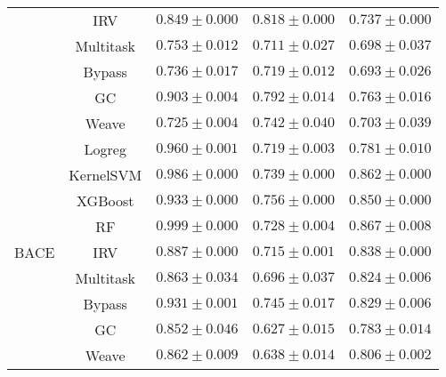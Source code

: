 \begin{table}[H]
\begin{tabular}{ |c|c|c|c|c| }
    & IRV & $0.849\pm0.000$ & $0.818\pm0.000$ & $0.737\pm0.000$ \\\cline{2-5}
    & Multitask & $0.753\pm0.012$ & $0.711\pm0.027$ & $0.698\pm0.037$ \\\cline{2-5}
    & Bypass & $0.736\pm0.017$ & $0.719\pm0.012$ & $0.693\pm0.026$ \\\cline{2-5}
    & GC & $0.903\pm0.004$ & $0.792\pm0.014$ & $0.763\pm0.016$ \\\cline{2-5}
    & Weave & $0.725\pm0.004$ & $0.742\pm0.040$ & $0.703\pm0.039$ \\\cline{2-5}
    \hline
    \hline    
    \multirow{9}{*}{BACE}
    & Logreg & $0.960\pm0.001$ & $0.719\pm0.003$ & $0.781\pm0.010$ \\\cline{2-5}
    & KernelSVM & $0.986\pm0.000$ & $0.739\pm0.000$ & $0.862\pm0.000$ \\\cline{2-5}
    & XGBoost & $0.933\pm0.000$ & $\mathbf{0.756\pm0.000}$ & $0.850\pm0.000$ \\\cline{2-5}
    & RF & $0.999\pm0.000$ & $0.728\pm0.004$ & $\mathbf{0.867\pm0.008}$ \\\cline{2-5}
    & IRV & $0.887\pm0.000$ & $0.715\pm0.001$ & $0.838\pm0.000$ \\\cline{2-5}
    & Multitask & $0.863\pm0.034$ & $0.696\pm0.037$ & $0.824\pm0.006$ \\\cline{2-5}
    & Bypass & $0.931\pm0.001$ & $0.745\pm0.017$ & $0.829\pm0.006$ \\\cline{2-5}
    & GC & $0.852\pm0.046$ & $0.627\pm0.015$ & $0.783\pm0.014$ \\\cline{2-5}
    & Weave & $0.862\pm0.009$ & $0.638\pm0.014$ & $0.806\pm0.002$ \\\cline{2-5}
    \hline
    \end{tabular}
    \label{tab:PCBA_MUV_HIV_BACE}
\end{table}
    
